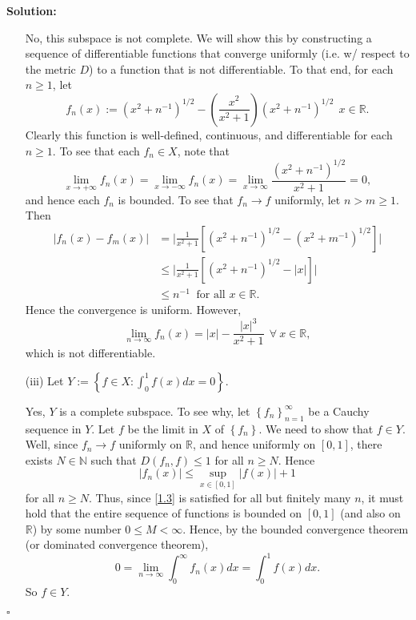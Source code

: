 \documentclass[12pt]{article}
\newcounter{ProofCounter}
\newenvironment{Solution}{\stepcounter{ProofCounter}\textbf{Solution:}}{\hfill$\square$}
\begin{document}
\begin{Solution}
\begin{enumerate}
      No, this subspace is not complete. We will show this by constructing a sequence of differentiable functions that converge uniformly (i.e. w/
      respect to the metric $D$) to a
      function that is not differentiable. To that end, for each $n \geq 1$, let 
      \[
        f_{n}(x) := (x^{2} + n^{-1})^{1/2} - \left( \frac{x^2}{x^2 + 1} \right)\left( x^{2} + n^{-1} \right)^{1/2} \ \ x \in \mathbb{R}.
      \]
      Clearly this function is well-defined, continuous, and differentiable for each $n \geq 1$. To see that each $f_{n} \in X$, note that 
      \[
        \lim_{x\rightarrow+\infty}f_{n}(x) = \lim_{x\rightarrow -\infty}f_{n}(x) = \lim_{x\rightarrow\infty} \frac{(x^2 + n^{-1})^{1/2}}{x^2+1} = 0,
      \]
      and hence each $f_n$ is bounded. To see that $f_{n} \rightarrow f$ uniformly, let $n > m \geq 1$. Then 
      \begin{align*}
        |f_{n}(x) - f_{m}(x)| & = \bigg| \frac{1}{x^2 + 1}\left[ (x^2 + n^{-1})^{1/2} - (x^{2} + m^{-1})^{1/2} \right]\bigg| \\
        & \leq \bigg| \frac{1}{x^2 + 1}\left[ (x^2 + n^{-1})^{1/2} - |x| \right]\bigg| \\
        & \leq n^{-1} \ \text{ for all } x \in \mathbb{R}.
      \end{align*}
      Hence the convergence is uniform.
      However,
      \[
        \lim_{n\rightarrow \infty}f_{n}(x) = |x| - \frac{|x|^3}{x^2 + 1} \ \ \forall \ x\in \mathbb{R},
      \]
      which is not differentiable.

    \item[(iii)] Let $Y := \left\{ f \in X : \int_{0}^{1}f(x)dx = 0 \right\}$.

      Yes, $Y$ is a complete subspace. To see why, let $\left\{ f_{n} \right\}_{n=1}^{\infty}$ be a Cauchy sequence in $Y$. Let $f$ be the limit in
      $X$ of $\left\{ f_{n} \right\}$. We need to show that $f \in Y$. Well, since $f_n \rightarrow f$ uniformly on $\mathbb{R}$, and hence uniformly
      on $[0,1]$, there exists $N \in \mathbb{N}$ such that $D(f_n, f) \leq 1$ for all $n \geq N$. Hence 
      \begin{equation}
        |f_{n}(x)| \leq \sup_{x\in[0,1]}|f(x)| + 1
        \label{1.3}
      \end{equation}
      for all $n \geq N$. Thus, since \eqref{1.3} is satisfied for all but finitely many $n$, it must hold that the entire sequence of functions is
      bounded on $[0,1]$ (and also on $\mathbb{R}$) by some number $0 \leq M < \infty$. Hence, by the bounded convergence theorem (or dominated
      convergence theorem),
      \[
        0 = \lim_{n\rightarrow\infty}\int_{0}^{\infty}f_{n}(x)dx = \int_{0}^{1}f(x)dx.
      \]
      So $f \in Y$.
  \end{enumerate}
\end{Solution}
\end{document}
